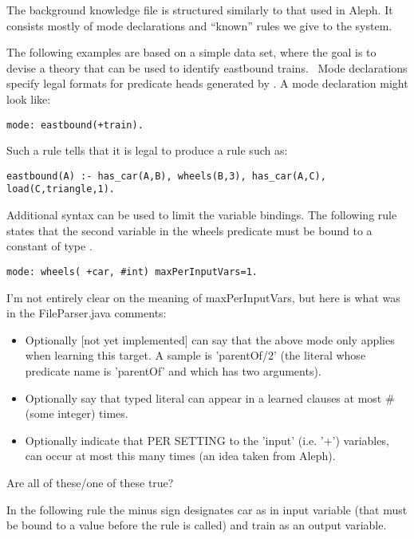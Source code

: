 \documentclass{article}
\begin{document}
The background knowledge file is structured similarly to that used in Aleph.  It consists mostly of mode declarations and ``known'' rules we give to the system.

The following examples are based on a simple data set, where the goal is to devise a theory that can be used to identify eastbound trains.~\cite{Michalski1980}  Mode declarations specify legal formats for predicate heads generated by \will.  A mode declaration might look like:

\begin{verbatim}
mode: eastbound(+train).
\end{verbatim}

Such a rule tells \will that it is legal to produce a rule such as:

\begin{verbatim}
eastbound(A) :- has_car(A,B), wheels(B,3), has_car(A,C), load(C,triangle,1).
\end{verbatim}

Additional syntax can be used to limit the variable bindings.  The following rule states that the second variable in the wheels predicate must be bound to a constant of type .  

\begin{verbatim}
mode: wheels( +car, #int) maxPerInputVars=1.
\end{verbatim}

\begin{rfc}
I'm not entirely clear on the meaning of maxPerInputVars, but here is what was in the FileParser.java comments:
\begin{itemize}
\item Optionally [not yet implemented] can say that the above mode only applies when learning this target.  A sample is 'parentOf/2' (the literal whose predicate name is 'parentOf' and which has two arguments).
\item Optionally say that typed literal can appear in a learned clauses at most # (some integer) times.
\item Optionally indicate that PER SETTING to the 'input' (i.e. '+') variables, can occur at most this many times (an idea taken from Aleph).
\end{itemize}  
Are all of these/one of these true?
\end{rfc}

In the following rule the minus sign designates car as in input variable (that must be bound to a value before the rule is called) and train as an output variable.
\end{document}
